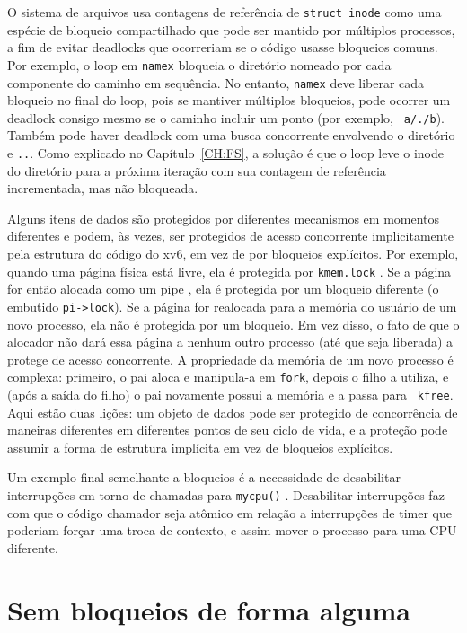 O sistema de arquivos usa contagens de referência de {\tt struct inode} como uma espécie de bloqueio compartilhado que pode ser mantido por múltiplos processos, a fim de evitar deadlocks que 
ocorreriam se o código usasse bloqueios comuns. Por exemplo, o loop em {\tt namex}  bloqueia o diretório nomeado por cada componente do caminho em sequência. No 
entanto, {\tt namex} deve liberar cada bloqueio no final do loop, pois se mantiver múltiplos bloqueios, pode ocorrer um deadlock consigo mesmo se o caminho incluir um ponto (por exemplo, {\tt 
a/./b}). Também pode haver deadlock com uma busca concorrente envolvendo o diretório e {\tt ..}. Como explicado no Capítulo~\ref{CH:FS}, a solução é que o loop leve o inode do diretório para a 
próxima iteração com sua contagem de referência incrementada, mas não bloqueada.

Alguns itens de dados são protegidos por diferentes mecanismos em momentos diferentes e podem, às vezes, ser protegidos de acesso concorrente implicitamente pela estrutura do código do xv6, em vez 
de por bloqueios explícitos. Por exemplo, quando uma página física está livre, ela é protegida por \texttt{kmem.lock} . Se a página for então alocada como um 
pipe , ela é protegida por um bloqueio diferente (o embutido \lstinline{pi->lock}). Se a página for realocada para a memória do usuário de um novo processo, ela 
não é protegida por um bloqueio. Em vez disso, o fato de que o alocador não dará essa página a nenhum outro processo (até que seja liberada) a protege de acesso concorrente. A propriedade da 
memória de um novo processo é complexa: primeiro, o pai aloca e manipula-a em {\tt fork}, depois o filho a utiliza, e (após a saída do filho) o pai novamente possui a memória e a passa para {\tt 
kfree}. Aqui estão duas lições: um objeto de dados pode ser protegido de concorrência de maneiras diferentes em diferentes pontos de seu ciclo de vida, e a proteção pode assumir a forma de 
estrutura implícita em vez de bloqueios explícitos.

Um exemplo final semelhante a bloqueios é a necessidade de desabilitar interrupções em torno de chamadas para {\tt mycpu()} . Desabilitar interrupções faz com que o 
código chamador seja atômico em relação a interrupções de timer que poderiam forçar uma troca de contexto, e assim mover o processo para uma CPU diferente.

\section{Sem bloqueios de forma alguma}

